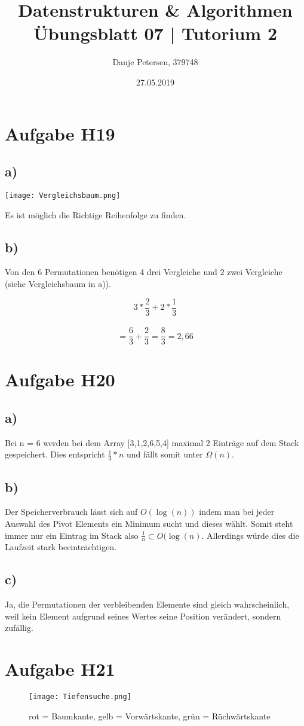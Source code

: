 \documentclass[a4paper,graphics,14pt]{article}
\author		{ \Large Danje Petersen, 379748}
\title{ \Huge Datenstrukturen \& Algorithmen \\
		\huge Übungsblatt 07 | Tutorium 2}
\date{27.05.2019}
\newcommand{\aufgabe}[1]{\section*{Aufgabe #1}}
\newcommand{\apt}[1]{\subsection*{#1} }
\begin{document}
\doublespacing
\maketitle
\onehalfspacing

\aufgabe{H19}

\apt{a)}

\texttt{[image: Vergleichsbaum.png]}

Es ist möglich die Richtige Reihenfolge zu finden.



\apt{b)}
Von den 6 Permutationen benötigen 4 drei Vergleiche und 2 zwei Vergleiche (siehe Vergleichsbaum in a)).
\begin{center}
\[ 3 * \frac{2}{3} + 2 * \frac{1}{3} \] \\ 
\[ = \frac{6}{3} + \frac{2}{3} = \frac{8}{3} = 2,66 \]
\end{center}


\aufgabe{H20}

\apt{a)}
Bei n = 6 werden bei dem Array [3,1,2,6,5,4] maximal 2 Einträge auf dem Stack gespeichert.
Dies entspricht $\frac{1}{3} * n$ und fällt somit unter $\Omega(n)$.

\apt{b)}
Der Speicherverbrauch lässt sich auf $O(\log{(n)})$ indem man bei jeder Auswahl des Pivot Elements ein Minimum sucht und dieses wählt. Somit steht immer nur ein Eintrag im Stack also $\frac{1}{n} \subset O(\log{(n)}$. Allerdings würde dies die Laufzeit stark beeinträchtigen. 

\apt{c)}
Ja, die Permutationen der verbleibenden Elemente sind gleich wahrscheinlich, weil kein Element aufgrund seines Wertes seine Position verändert, sondern zufällig.



\aufgabe{H21}

\begin{figure}[h]
\texttt{[image: Tiefensuche.png]}
\caption{rot = Baumkante, gelb = Vorwärtskante, grün = Rüchwärtskante}
\end{figure}
\end{document}
